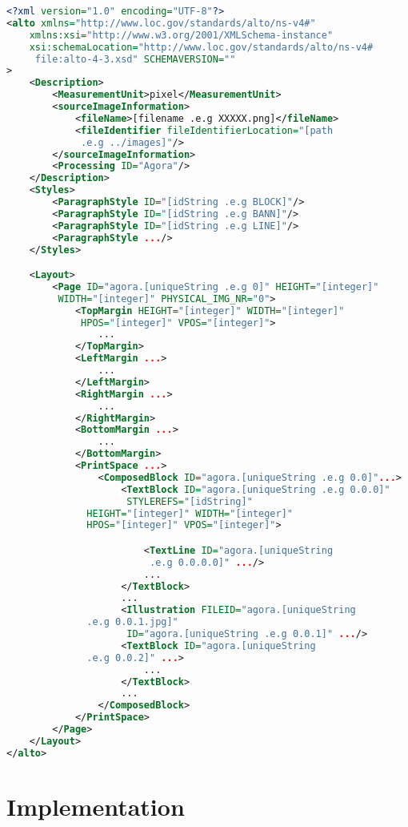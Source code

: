 \documentclass{polytech/polytech}
\numberwithin{figure}{chapter}
\begin{document}
\begin{lstlisting}[language=XML]
<?xml version="1.0" encoding="UTF-8"?>
<alto xmlns="http://www.loc.gov/standards/alto/ns-v4#"
    xmlns:xsi="http://www.w3.org/2001/XMLSchema-instance"
    xsi:schemaLocation="http://www.loc.gov/standards/alto/ns-v4#
     file:alto-4-3.xsd" SCHEMAVERSION=""
>
    <Description>
        <MeasurementUnit>pixel</MeasurementUnit>
        <sourceImageInformation>
            <fileName>[filename .e.g XXXXX.png]</fileName>
            <fileIdentifier fileIdentifierLocation="[path
             .e.g ../images]"/>
        </sourceImageInformation>
        <Processing ID="Agora"/>
    </Description>
    <Styles>
        <ParagraphStyle ID="[idString .e.g BLOCK]"/>
        <ParagraphStyle ID="[idString .e.g BANN]"/>
        <ParagraphStyle ID="[idString .e.g LINE]"/>
        <ParagraphStyle .../>
    </Styles>

    <Layout>
        <Page ID="agora.[uniqueString .e.g 0]" HEIGHT="[integer]"
         WIDTH="[integer]" PHYSICAL_IMG_NR="0">
            <TopMargin HEIGHT="[integer]" WIDTH="[integer]"
             HPOS="[integer]" VPOS="[integer]">
                ...
            </TopMargin>
            <LeftMargin ...>
                ...
            </LeftMargin>
            <RightMargin ...>
                ...
            </RightMargin>
            <BottomMargin ...>
                ...
            </BottomMargin>
            <PrintSpace ...>
                <ComposedBlock ID="agora.[uniqueString .e.g 0.0]"...>
                    <TextBlock ID="agora.[uniqueString .e.g 0.0.0]"
                     STYLEREFS="[idString]"
			  HEIGHT="[integer]" WIDTH="[integer]"
			  HPOS="[integer]" VPOS="[integer]">

                        <TextLine ID="agora.[uniqueString
                         .e.g 0.0.0.0]" .../>
                        ...
                    </TextBlock>
                    ...
                    <Illustration FILEID="agora.[uniqueString
			  .e.g 0.0.1.jpg]"
                     ID="agora.[uniqueString .e.g 0.0.1]" .../>
                    <TextBlock ID="agora.[uniqueString
			  .e.g 0.0.2]" ...>
                        ...
                    </TextBlock>
                    ...
                </ComposedBlock>
            </PrintSpace>
        </Page>
    </Layout>
</alto>

\end{lstlisting}



\chapter{Implementation}
\end{document}
